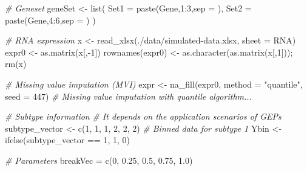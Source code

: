 \documentclass[
  12pt,
]{book}
\newenvironment{Shaded}{\begin{snugshade}}{\end{snugshade}}
\newcommand{\AttributeTok}[1]{\textcolor[rgb]{0.77,0.63,0.00}{#1}}
\newcommand{\CommentTok}[1]{\textcolor[rgb]{0.56,0.35,0.01}{\textit{#1}}}
\newcommand{\DecValTok}[1]{\textcolor[rgb]{0.00,0.00,0.81}{#1}}
\newcommand{\FloatTok}[1]{\textcolor[rgb]{0.00,0.00,0.81}{#1}}
\newcommand{\FunctionTok}[1]{\textcolor[rgb]{0.00,0.00,0.00}{#1}}
\newcommand{\NormalTok}[1]{#1}
\newcommand{\OtherTok}[1]{\textcolor[rgb]{0.56,0.35,0.01}{#1}}
\newcommand{\SpecialCharTok}[1]{\textcolor[rgb]{0.00,0.00,0.00}{#1}}
\newcommand{\StringTok}[1]{\textcolor[rgb]{0.31,0.60,0.02}{#1}}
\begin{document}
\begin{Shaded}
\begin{Highlighting}[]
\CommentTok{\# Geneset}
\NormalTok{geneSet }\OtherTok{\textless{}{-}} \FunctionTok{list}\NormalTok{(}
  \AttributeTok{Set1 =} \FunctionTok{paste}\NormalTok{(}\StringTok{\textquotesingle{}Gene\textquotesingle{}}\NormalTok{,}\DecValTok{1}\SpecialCharTok{:}\DecValTok{3}\NormalTok{,}\AttributeTok{sep =} \StringTok{\textquotesingle{}\textquotesingle{}}\NormalTok{),}
  \AttributeTok{Set2 =} \FunctionTok{paste}\NormalTok{(}\StringTok{\textquotesingle{}Gene\textquotesingle{}}\NormalTok{,}\DecValTok{4}\SpecialCharTok{:}\DecValTok{6}\NormalTok{,}\AttributeTok{sep =} \StringTok{\textquotesingle{}\textquotesingle{}}\NormalTok{)}
\NormalTok{)}

\CommentTok{\# RNA expression}
\NormalTok{x }\OtherTok{\textless{}{-}} \FunctionTok{read\_xlsx}\NormalTok{(}\StringTok{\textquotesingle{}./data/simulated{-}data.xlsx\textquotesingle{}}\NormalTok{, }\AttributeTok{sheet =} \StringTok{\textquotesingle{}RNA\textquotesingle{}}\NormalTok{)}
\NormalTok{expr0 }\OtherTok{\textless{}{-}} \FunctionTok{as.matrix}\NormalTok{(x[,}\SpecialCharTok{{-}}\DecValTok{1}\NormalTok{])}
\FunctionTok{rownames}\NormalTok{(expr0) }\OtherTok{\textless{}{-}} \FunctionTok{as.character}\NormalTok{(}\FunctionTok{as.matrix}\NormalTok{(x[,}\DecValTok{1}\NormalTok{])); }\FunctionTok{rm}\NormalTok{(x)}

\CommentTok{\# Missing value imputation (MVI)}
\NormalTok{expr }\OtherTok{\textless{}{-}} \FunctionTok{na\_fill}\NormalTok{(expr0, }\AttributeTok{method =} \StringTok{"quantile"}\NormalTok{, }\AttributeTok{seed =} \DecValTok{447}\NormalTok{)}
\CommentTok{\#  Missing value imputation with quantile algorithm...}

\CommentTok{\# Subtype information}
\CommentTok{\# It depends on the application scenarios of GEPs}
\NormalTok{subtype\_vector }\OtherTok{\textless{}{-}} \FunctionTok{c}\NormalTok{(}\DecValTok{1}\NormalTok{, }\DecValTok{1}\NormalTok{, }\DecValTok{1}\NormalTok{, }\DecValTok{2}\NormalTok{, }\DecValTok{2}\NormalTok{, }\DecValTok{2}\NormalTok{)}
\CommentTok{\# Binned data for subtype 1}
\NormalTok{Ybin }\OtherTok{\textless{}{-}} \FunctionTok{ifelse}\NormalTok{(subtype\_vector }\SpecialCharTok{==} \DecValTok{1}\NormalTok{, }\DecValTok{1}\NormalTok{, }\DecValTok{0}\NormalTok{)}

\CommentTok{\# Parameters}
\NormalTok{breakVec }\OtherTok{=} \FunctionTok{c}\NormalTok{(}\DecValTok{0}\NormalTok{, }\FloatTok{0.25}\NormalTok{, }\FloatTok{0.5}\NormalTok{, }\FloatTok{0.75}\NormalTok{, }\FloatTok{1.0}\NormalTok{)}


\end{Highlighting}
\end{Shaded}
\end{document}
